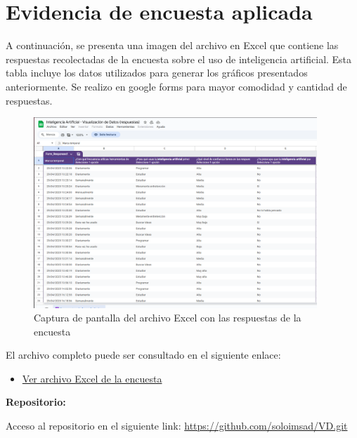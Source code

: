 \documentclass[12pt, a4paper]{article}
\begin{document}
\section{Evidencia de encuesta aplicada}

A continuación, se presenta una imagen del archivo en Excel que contiene las respuestas recolectadas de la encuesta sobre el uso de inteligencia artificial. Esta tabla incluye los datos utilizados para generar los gráficos presentados anteriormente. Se realizo en google forms para mayor comodidad y cantidad de respuestas. 

\begin{figure}[H]
    \centering
    \includegraphics[width=0.95\textwidth]{Graficos/excel.png} %
    \caption{Captura de pantalla del archivo Excel con las respuestas de la encuesta}
\end{figure}

El archivo completo puede ser consultado en el siguiente enlace:

\begin{itemize}
    \item \href{https://docs.google.com/spreadsheets/d/1KRdGL7pflDiA8TAT_pvPSt6OpXGPv6h4NTGceC8xDS0/edit?resourcekey=&gid=168064728#gid=168064728}{Ver archivo Excel de la encuesta}
\end{itemize}


\textbf{Repositorio:}  
\label{anexo:repositorio}

Acceso al repositorio en el siguiente link: 
\url{https://github.com/soloimsad/VD.git}
\end{document}
